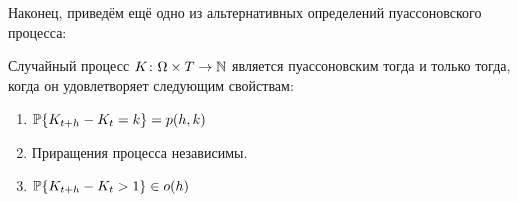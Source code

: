 Наконец, приведём ещё одно из альтернативных определений пуассоновского процесса:

\begin{statement}
    \label{statement:special:Poisson_process_alternative_definition}
    Случайный процесс $ K\colon \Omega \times T \to \mathbb{N} $ является пуассоновским тогда и только тогда, когда он удовлетворяет следующим свойствам:
    \begin{enumerate}
        \item
            $ \mathbb{P} \{ K_{t + h} - K_t = k \} = p(h, k) $
        \item
            Приращения процесса независимы.
        \item
            $ \mathbb{P} \{ K_{t + h} - K_t > 1 \} \in o(h) $
    \end{enumerate}
\end{statement}
